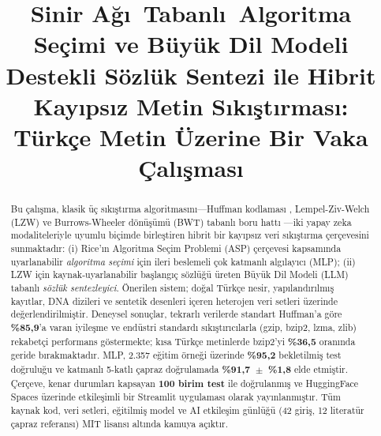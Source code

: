 \documentclass[conference]{IEEEtran}
\begin{document}
\title{Sinir A\u{g}\i\ Tabanl\i\ Algoritma Se\c{c}imi ve Büyük Dil Modeli Destekli Sözlük Sentezi ile Hibrit Kay\i ps\i z Metin S\i k\i\c{s}t\i rmas\i: Türkçe Metin Üzerine Bir Vaka Çal\i\c{s}mas\i}

\author{
}

\maketitle

\begin{abstract}
Bu çalışma, klasik üç sıkıştırma algoritmasını---Huffman kodlaması \cite{huffman1952}, Lempel-Ziv-Welch (LZW) \cite{welch1984} ve Burrows-Wheeler dönüşümü (BWT) tabanlı boru hattı \cite{burrows1994}---iki yapay zeka modaliteleriyle uyumlu biçimde birleştiren hibrit bir kayıpsız veri sıkıştırma çerçevesini sunmaktadır: (i) Rice'ın \cite{rice1976} Algoritma Seçim Problemi (ASP) çerçevesi kapsamında uyarlanabilir \emph{algoritma seçimi} için ileri beslemeli çok katmanlı algılayıcı (MLP); (ii) LZW için kaynak-uyarlanabilir başlangıç sözlüğü üreten Büyük Dil Modeli (LLM) tabanlı \emph{sözlük sentezleyici}. Önerilen sistem; doğal Türkçe nesir, yapılandırılmış kayıtlar, DNA dizileri ve sentetik desenleri içeren heterojen veri setleri üzerinde değerlendirilmiştir. Deneysel sonuçlar, tekrarlı verilerde standart Huffman'a göre \textbf{\%85,9}'a varan iyileşme ve endüstri standardı sıkıştırıcılarla (gzip, bzip2, lzma, zlib) rekabetçi performans göstermekte; kısa Türkçe metinlerde bzip2'yi \textbf{\%36,5} oranında geride bırakmaktadır. MLP, 2.357 eğitim örneği üzerinde \textbf{\%95,2} bekletilmiş test doğruluğu ve katmanlı 5-katlı çapraz doğrulamada \textbf{\%91,7~\(\pm\)~\%1,8} elde etmiştir. Çerçeve, kenar durumları kapsayan \textbf{100 birim test} ile doğrulanmış ve HuggingFace Spaces üzerinde etkileşimli bir Streamlit uygulaması olarak yayınlanmıştır. Tüm kaynak kod, veri setleri, eğitilmiş model ve AI etkileşim günlüğü (42 giriş, 12 literatür çapraz referansı) MIT lisansı altında kamuya açıktır.
\end{abstract}
\end{document}
